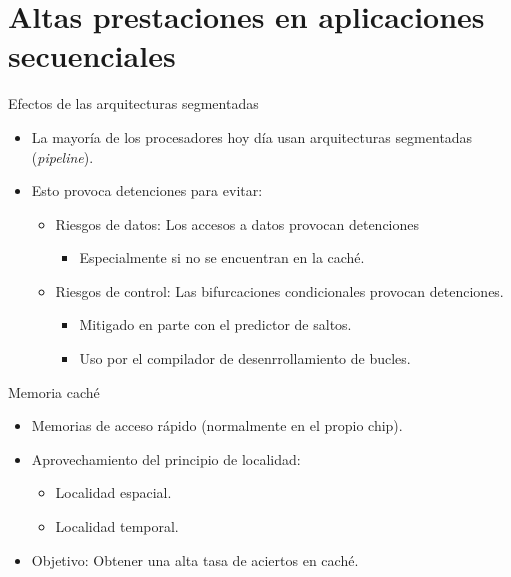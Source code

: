 \section{Altas prestaciones en aplicaciones secuenciales}

\begin{frame}[t]{Efectos de las arquitecturas segmentadas}
\begin{itemize}
  \item La mayoría de los procesadores hoy día usan arquitecturas segmentadas (\emph{pipeline}).
  \item Esto provoca detenciones para evitar:
    \begin{itemize}
      \item Riesgos de datos: Los accesos a datos provocan detenciones
        \begin{itemize}
          \item Especialmente si no se encuentran en la caché.
        \end{itemize}
      \item Riesgos de control: Las bifurcaciones condicionales provocan detenciones.
        \begin{itemize}
          \item Mitigado en parte con el predictor de saltos.
          \item Uso por el compilador de desenrrollamiento de bucles.
        \end{itemize}
    \end{itemize}
\end{itemize}
\end{frame}

\begin{frame}[t]{Memoria caché}
\begin{itemize}
  \item Memorias de acceso rápido (normalmente en el propio chip).
  \item Aprovechamiento del principio de localidad:
    \begin{itemize}
      \item Localidad espacial.
      \item Localidad temporal.
    \end{itemize}
  \item Objetivo: Obtener una alta tasa de aciertos en caché.
\end{itemize}
\end{frame}


